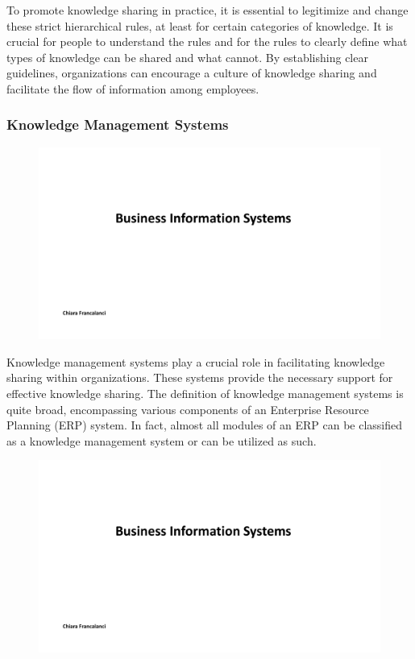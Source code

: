 To promote knowledge sharing in practice, it is essential to legitimize
and change these strict hierarchical rules, at least for certain
categories of knowledge. It is crucial for people to understand the
rules and for the rules to clearly define what types of knowledge can be
shared and what cannot. By establishing clear guidelines, organizations
can encourage a culture of knowledge sharing and facilitate the flow of
information among employees.

\subsubsection{Knowledge Management
  Systems}\label{knowledge-management-systems}

\begin{figure}[!h]
  \centering
  \includegraphics[page=15, trim = 1.5cm 7cm 1.5cm 4cm, clip, width=\imagewidth]{images/05 - KM.pdf}
\end{figure}

Knowledge management systems play a crucial role in facilitating
knowledge sharing within organizations. These systems provide the
necessary support for effective knowledge sharing. The definition of
knowledge management systems is quite broad, encompassing various
components of an Enterprise Resource Planning (ERP) system. In fact,
almost all modules of an ERP can be classified as a knowledge management
system or can be utilized as such.

\begin{figure}[!h]
  \centering
  \includegraphics[page=16, trim = 3cm 3.8cm 4cm 5.3cm, clip, width=\imagewidth]{images/05 - KM.pdf}
\end{figure}

